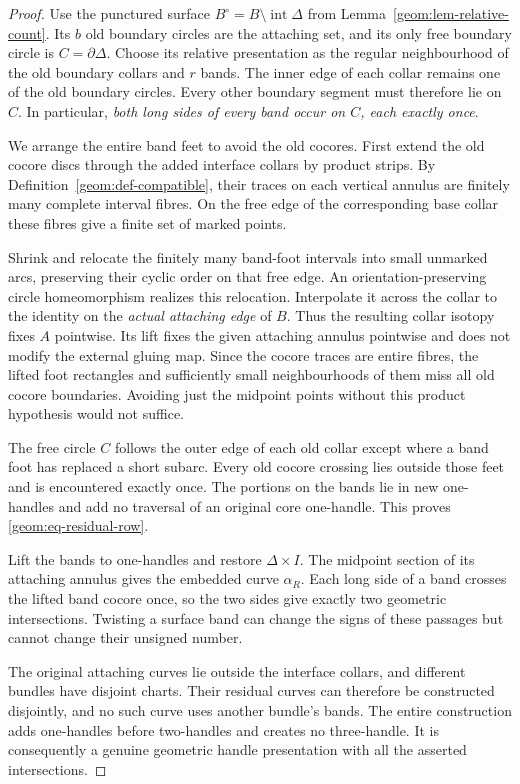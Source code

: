\begin{proof}
Use the punctured surface $B^\circ=B\setminus\operatorname{int}\Delta$
from Lemma~\ref{geom:lem-relative-count}.  Its $b$ old boundary circles
are the attaching set, and its only free boundary circle is
$C=\partial\Delta$.  Choose its relative presentation as the regular
neighbourhood of the old boundary collars and $r$ bands.  The inner
edge of each collar remains one of the old boundary circles.  Every
other boundary segment must therefore lie on $C$.  In particular,
\emph{both long sides of every band occur on $C$, each exactly once}.

We arrange the entire band feet to avoid the old cocores.  First extend
the old cocore discs through the added interface collars by product
strips.  By Definition~\ref{geom:def-compatible}, their traces on each
vertical annulus are finitely many complete interval fibres.  On the
free edge of the corresponding base collar these fibres give a finite
set of marked points.

Shrink and relocate the finitely many band-foot intervals into small
unmarked arcs, preserving their cyclic order on that free edge.  An
orientation-preserving circle homeomorphism realizes this relocation.
Interpolate it across the collar to the identity on the \emph{actual
attaching edge} of $B$.  Thus the resulting collar isotopy fixes $A$
pointwise.  Its lift fixes the given attaching annulus pointwise and
does not modify the external gluing map.  Since the cocore traces are
entire fibres, the lifted foot rectangles and sufficiently small
neighbourhoods of them miss all old cocore boundaries.  Avoiding just
the midpoint points without this product hypothesis would not suffice.

The free circle $C$ follows the outer edge of each old collar except
where a band foot has replaced a short subarc.  Every old cocore
crossing lies outside those feet and is encountered exactly once.
The portions on the bands lie in new one-handles and add no traversal
of an original core one-handle.  This proves
\eqref{geom:eq-residual-row}.

Lift the bands to one-handles and restore $\Delta\times I$.  The
midpoint section of its attaching annulus gives the embedded curve
$\alpha_R$.  Each long side of a band crosses the lifted band cocore
once, so the two sides give exactly two geometric intersections.
Twisting a surface band can change the signs of these passages but
cannot change their unsigned number.

The original attaching curves lie outside the interface collars, and
different bundles have disjoint charts.  Their residual curves can
therefore be constructed disjointly, and no such curve uses another
bundle's bands.  The entire construction adds one-handles before
two-handles and creates no three-handle.  It is consequently a genuine
geometric handle presentation with all the asserted intersections.
\end{proof}

